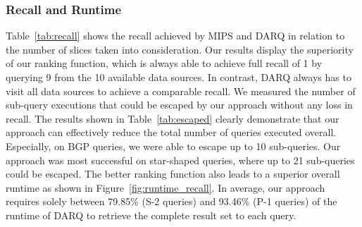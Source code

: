 \documentclass{sig-alternate}  %
\begin{document}
\subsubsection{Recall and Runtime}

Table~\ref{tab:recall} shows the recall achieved by MIPS and DARQ in relation to the number of slices taken into consideration. 
Our results display the superiority of our ranking function, which is always able to achieve full recall of 1 by querying 9 from the 10 available data sources. 
In contrast, DARQ always has to visit all data sources to achieve a comparable recall. 
We measured the number of sub-query executions that could be escaped by our approach without any loss in recall. 
The results shown in Table~\ref{tab:escaped} clearly demonstrate that our approach can effectively reduce the total number of queries executed overall.
Especially, on BGP queries, we were able to escape up to 10 sub-queries. 
Our approach was most successful on star-shaped queries, where up to 21 sub-queries could be escaped. 
The better ranking function also leads to a superior overall runtime as shown in Figure~\ref{fig:runtime_recall}.
In average, our approach requires solely between 79.85\% (S-2 queries) and 93.46\% (P-1 queries) of the runtime of DARQ to retrieve the complete result set to each query.
\end{document}
